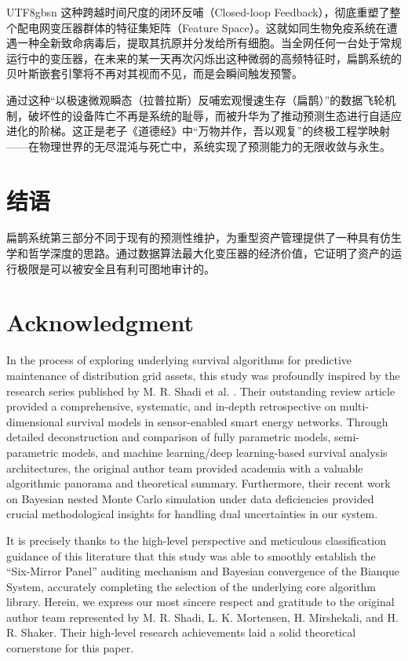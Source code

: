\documentclass[journal]{IEEEtran}
\begin{document}
\begin{CJK*}{UTF8}{gbsn}
这种跨越时间尺度的闭环反哺（Closed-loop Feedback）\cite{TODO_CITE_DIGITAL_TWIN_FEEDBACK}，彻底重塑了整个配电网变压器群体的特征集矩阵（Feature Space）。这就如同生物免疫系统在遭遇一种全新致命病毒后，提取其抗原并分发给所有细胞。当全网任何一台处于常规运行中的变压器，在未来的某一天再次闪烁出这种微弱的高频特征时，扁鹊系统的贝叶斯嵌套引擎将不再对其视而不见，而是会瞬间触发预警。

通过这种“以极速微观瞬态（拉普拉斯）反哺宏观慢速生存（扁鹊）”的数据飞轮机制，破坏性的设备阵亡不再是系统的耻辱，而被升华为了推动预测生态进行自适应进化的阶梯。这正是老子《道德经》中“万物并作，吾以观复”的终极工程学映射——在物理世界的无尽混沌与死亡中，系统实现了预测能力的无限收敛与永生。

\section{结语}
扁鹊系统第三部分不同于现有的预测性维护，为重型资产管理\cite{zeng2026offshore}提供了一种具有仿生学和哲学深度的思路。通过数据算法最大化变压器的经济价值，它证明了资产的运行极限是可以被安全且有利可图地审计的。

\section*{Acknowledgment}
In the process of exploring underlying survival algorithms for predictive maintenance of distribution grid assets, this study was profoundly inspired by the research series published by M. R. Shadi et al. \cite{shadi2026survival, shadi2025proactive}. Their outstanding review article \cite{shadi2026survival} provided a comprehensive, systematic, and in-depth retrospective on multi-dimensional survival models in sensor-enabled smart energy networks. Through detailed deconstruction and comparison of fully parametric models, semi-parametric models, and machine learning/deep learning-based survival analysis architectures, the original author team provided academia with a valuable algorithmic panorama and theoretical summary. Furthermore, their recent work on Bayesian nested Monte Carlo simulation under data deficiencies \cite{shadi2025proactive} provided crucial methodological insights for handling dual uncertainties in our system.

It is precisely thanks to the high-level perspective and meticulous classification guidance of this literature that this study was able to smoothly establish the ``Six-Mirror Panel'' auditing mechanism and Bayesian convergence of the Bianque System, accurately completing the selection of the underlying core algorithm library. Herein, we express our most sincere respect and gratitude to the original author team represented by M. R. Shadi, L. K. Mortensen, H. Mirshekali, and H. R. Shaker. Their high-level research achievements laid a solid theoretical cornerstone for this paper.


\end{CJK*}
\end{document}
